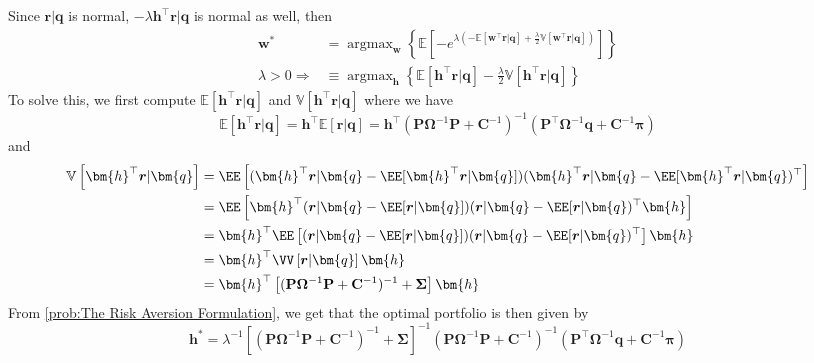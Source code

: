 Since $\bm{r}|\bm{q}$ is normal, $-\lambda\bm{h}^\top \bm{r}|\bm{q}$ is normal as well, then
\begin{align*}
\bm{w}^*&=\operatorname{argmax}_{\bm{w}}\left\{\mathbb{E}\left[-e^{\lambda\left(-\mathbb{E}\left[\bm{w}^{\top} \boldsymbol{r}|\bm{q}\right]+\frac{\lambda}{2} \mathbb{V}\left[\bm{w}^{\top} \boldsymbol{r}|\bm{q}\right]\right)}\right]\right\}\\
\lambda>0\Longrightarrow
&\equiv\operatorname{argmax}_{\bm{h}}\left\{\mathbb{E}\left[\bm{h}^{\top} \boldsymbol{r}|\bm{q}\right]-\frac{\lambda}{2} \mathbb{V}\left[\bm{h}^{\top} \boldsymbol{r}|\bm{q}\right]\right\}
\end{align*}
To solve this, we first compute $\mathbb{E}\left[\bm{h}^{\top} \boldsymbol{r}|\bm{q}\right]$ and $\mathbb{V}\left[\bm{h}^{\top} \boldsymbol{r}|\bm{q}\right]$ where we have
\[
\mathbb{E}\left[\bm{h}^{\top} \boldsymbol{r}|\bm{q}\right] = \bm{h}^{\top}\mathbb{E}\left[ \boldsymbol{r}|\bm{q}\right] = \bm{h}^{\top}(\mathbf{P}\mathbf{\Omega}^{-1}\mathbf{P}+\mathbf{C}^{-1})^{-1}(\mathbf{P}^\top \mathbf{\Omega}^{-1}\bm{q}+\mathbf{C}^{-1}\bm{\pi}  ) 
\]
and 
\begin{align*}
\mathbb{V}\left[\bm{h}^{\top} \boldsymbol{r}|\bm{q}\right] &= \EE\left[(\bm{h}^{\top} \boldsymbol{r}|\bm{q}-\EE[\bm{h}^{\top} \boldsymbol{r}|\bm{q}])(\bm{h}^{\top} \boldsymbol{r}|\bm{q}-\EE[\bm{h}^{\top} \boldsymbol{r}|\bm{q})^\top\right]\\
&=\EE\left[\bm{h}^{\top}( \boldsymbol{r}|\bm{q}-\EE[ \boldsymbol{r}|\bm{q}])( \boldsymbol{r}|\bm{q}-\EE[ \boldsymbol{r}|\bm{q})^\top\bm{h}\right]\\
&=\bm{h}^{\top}\EE\left[( \boldsymbol{r}|\bm{q}-\EE[ \boldsymbol{r}|\bm{q}])( \boldsymbol{r}|\bm{q}-\EE[ \boldsymbol{r}|\bm{q})^\top\right]\bm{h}\\
&=\bm{h}^{\top}\VV\left[ \boldsymbol{r}|\bm{q}\right]\bm{h}\\
&=\bm{h}^{\top}\left[(\mathbf{P}\mathbf{\Omega}^{-1}\mathbf{P}+\mathbf{C}^{-1})^{-1}+\mathbf{\Sigma}\right]\bm{h}
\end{align*}
From \cref{prob:The Risk Aversion Formulation}, we get that the optimal portfolio is then given by
$$
\bm{h}^*=\lambda^{-1}\left[(\mathbf{P}\mathbf{\Omega}^{-1}\mathbf{P}+\mathbf{C}^{-1})^{-1}+\mathbf{\Sigma}\right]^{-1} (\mathbf{P}\mathbf{\Omega}^{-1}\mathbf{P}+\mathbf{C}^{-1})^{-1}(\mathbf{P}^\top \mathbf{\Omega}^{-1}\bm{q}+\mathbf{C}^{-1}\bm{\pi}  ) 
$$